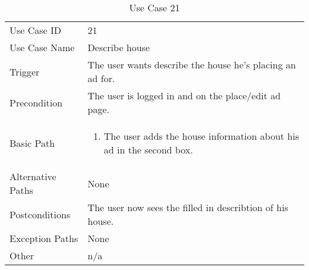 \begin{table}[H]
\centering
\label{table-use-case-21}
\begin{tabular}{|p{3cm}|p{10cm}}
Use Case ID       & 21                                                      \\
Use Case Name     & Describe house                            \\
Trigger           & The user wants describe the house he's placing an ad for.\\
Precondition      & The user is logged in and on the place/edit ad page.            
\\
Basic Path        & \begin{enumerate}
\item		The user adds the house information about his ad in the second box. 
\end{enumerate} 
     \\
Alternative Paths & None                          \\
Postconditions    & The user now sees the filled in describtion of his house.	\\
Exception Paths   & None			\\
Other             & n/a                                                                                                                                                                                                        
\end{tabular}
\caption{Use Case 21}
\end{table}


